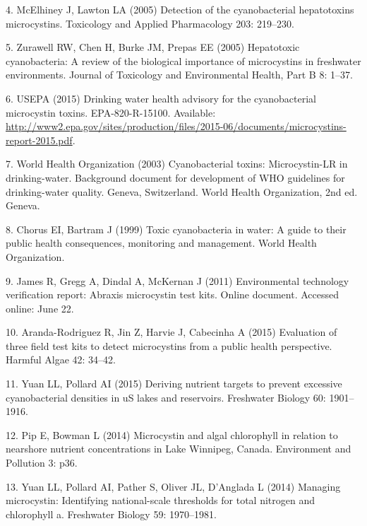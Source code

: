 \documentclass[11pt,]{article}
\begin{document}
\hypertarget{ref-mcelhiney2005detection}{}
4. McElhiney J, Lawton LA (2005) Detection of the cyanobacterial
hepatotoxins microcystins. Toxicology and Applied Pharmacology 203:
219--230.

\hypertarget{ref-zurawell2005hepatotoxic}{}
5. Zurawell RW, Chen H, Burke JM, Prepas EE (2005) Hepatotoxic
cyanobacteria: A review of the biological importance of microcystins in
freshwater environments. Journal of Toxicology and Environmental Health,
Part B 8: 1--37.

\hypertarget{ref-usepa2015drinking}{}
6. USEPA (2015) Drinking water health advisory for the cyanobacterial
microcystin toxins. EPA-820-R-15100. Available:
\url{http://www2.epa.gov/sites/production/files/2015-06/documents/microcystins-report-2015.pdf}.

\hypertarget{ref-world2003cyanobacterial}{}
7. World Health Organization (2003) Cyanobacterial toxins:
Microcystin-LR in drinking-water. Background document for development of
WHO guidelines for drinking-water quality. Geneva, Switzerland. World
Health Organization, 2nd ed. Geneva.

\hypertarget{ref-chorus1999toxic}{}
8. Chorus EI, Bartram J (1999) Toxic cyanobacteria in water: A guide to
their public health consequences, monitoring and management. World
Health Organization.

\hypertarget{ref-james2011environmental}{}
9. James R, Gregg A, Dindal A, McKernan J (2011) Environmental
technology verification report: Abraxis microcystin test kits. Online
document. Accessed online: June 22.

\hypertarget{ref-aranda2015evaluation}{}
10. Aranda-Rodriguez R, Jin Z, Harvie J, Cabecinha A (2015) Evaluation
of three field test kits to detect microcystins from a public health
perspective. Harmful Algae 42: 34--42.

\hypertarget{ref-yuan2015deriving}{}
11. Yuan LL, Pollard AI (2015) Deriving nutrient targets to prevent
excessive cyanobacterial densities in uS lakes and reservoirs.
Freshwater Biology 60: 1901--1916.

\hypertarget{ref-pip2014microcystin}{}
12. Pip E, Bowman L (2014) Microcystin and algal chlorophyll in relation
to nearshore nutrient concentrations in Lake Winnipeg, Canada.
Environment and Pollution 3: p36.

\hypertarget{ref-yuan2014managing}{}
13. Yuan LL, Pollard AI, Pather S, Oliver JL, D'Anglada L (2014)
Managing microcystin: Identifying national-scale thresholds for total
nitrogen and chlorophyll a. Freshwater Biology 59: 1970--1981.
\end{document}
